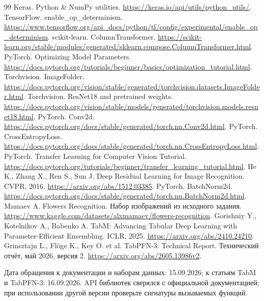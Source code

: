 \begin{thebibliography}{99}
 Keras. Python \& NumPy utilities.
\url{https://keras.io/api/utils/python_utils/}.
 TensorFlow. enable\_op\_determinism.
\url{https://www.tensorflow.org/api_docs/python/tf/config/experimental/enable_op_determinism}.
 scikit-learn. ColumnTransformer.
\url{https://scikit-learn.org/stable/modules/generated/sklearn.compose.ColumnTransformer.html}.
 PyTorch. Optimizing Model Parameters.
\url{https://docs.pytorch.org/tutorials/beginner/basics/optimization_tutorial.html}.
 Torchvision. ImageFolder.
\url{https://docs.pytorch.org/vision/stable/generated/torchvision.datasets.ImageFolder.html}.
 Torchvision. ResNet18 and pretrained weights.
\url{https://docs.pytorch.org/vision/stable/models/generated/torchvision.models.resnet18.html}.
 PyTorch. Conv2d.
\url{https://docs.pytorch.org/docs/stable/generated/torch.nn.Conv2d.html}.
 PyTorch. CrossEntropyLoss.
\url{https://docs.pytorch.org/docs/stable/generated/torch.nn.CrossEntropyLoss.html}.
 PyTorch. Transfer Learning for Computer Vision Tutorial.
\url{https://docs.pytorch.org/tutorials/beginner/transfer_learning_tutorial.html}.
 He K., Zhang X., Ren S., Sun J. Deep Residual Learning for Image Recognition. CVPR, 2016.
\url{https://arxiv.org/abs/1512.03385}.
 PyTorch. BatchNorm2d.
\url{https://docs.pytorch.org/docs/stable/generated/torch.nn.BatchNorm2d.html}.
 Mamaev A. Flowers Recognition. Набор изображений из исходного задания.
\url{https://www.kaggle.com/datasets/alxmamaev/flowers-recognition}.
 Gorishniy Y., Kotelnikov A., Babenko A. TabM: Advancing Tabular Deep Learning with Parameter-Efficient Ensembling. ICLR, 2025.
\url{https://arxiv.org/abs/2410.24210}.
 Grinsztajn L., Flöge K., Key O. et al. TabPFN-3: Technical Report. Технический отчёт, май 2026, версия 2.
\url{https://arxiv.org/abs/2605.13986v2}.
\end{thebibliography}
\noindent Дата обращения к документации и наборам данных: 15.09.2026;
к статьям TabM и TabPFN-3: 16.09.2026.
API библиотек сверялся с официальной документацией; при использовании
другой версии проверьте сигнатуры вызываемых функций.
\endgroup
